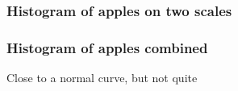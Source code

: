 \documentclass[handout]{beamer}
\begin{document}


   \begin{frame}
   \frametitle{Histogram of apples on two scales}
   \begin{center}
   \end{center}

   \end{frame}



   \begin{frame}
   \frametitle{Histogram of apples combined}
   \begin{center}
   \end{center}
   Close to a normal curve, but not quite
   \end{frame}
\end{document}
